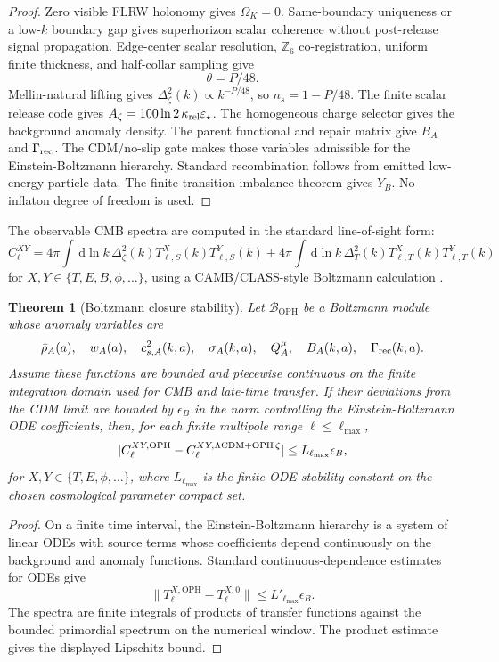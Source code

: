 \documentclass[11pt]{article}
\newtheorem{theorem}{Theorem}[section]
\newcommand{\OPH}{\mathrm{OPH}}
\newcommand{\Zsix}{\mathbb Z_6}
\newcommand{\dd}{\,\mathrm d}
\begin{document}
\begin{proof}
Zero visible FLRW holonomy gives \(\Omega_K=0\). Same-boundary uniqueness or a low-\(k\) boundary
gap gives superhorizon scalar coherence without post-release signal propagation. Edge-center scalar
resolution, \(\Zsix\) co-registration, uniform finite thickness, and half-collar sampling give
\[
\theta=P/48.
\]
Mellin-natural lifting gives \(\Delta_\zeta^2(k)\propto k^{-P/48}\), so \(n_s=1-P/48\). The finite
scalar release code gives \(A_\zeta=100\ln2\,\kappa_{\rm rel}\varepsilon_\star\). The homogeneous
charge selector gives the background anomaly density. The parent functional and repair matrix give
\(B_A\) and \(\Gamma_{\rm rec}\). The CDM/no-slip gate makes those variables admissible for the
Einstein-Boltzmann hierarchy. Standard recombination follows from emitted low-energy particle data.
The finite transition-imbalance theorem gives \(Y_B\). No inflaton degree of freedom is used.
\end{proof}

The observable CMB spectra are computed in the standard line-of-sight form:
\[
\boxed{
C_\ell^{XY}
=
4\pi\int\dd\ln k\,
\Delta_\zeta^2(k)T_{\ell,S}^{X}(k)T_{\ell,S}^{Y}(k)
+
4\pi\int\dd\ln k\,
\Delta_T^2(k)T_{\ell,T}^{X}(k)T_{\ell,T}^{Y}(k)
}
\]
for \(X,Y\in\{T,E,B,\phi,\ldots\}\), using a CAMB/CLASS-style Boltzmann calculation
\cite{camb,class}.

\begin{theorem}[Boltzmann closure stability]\label{thm:boltzmann-stability}
Let \(\mathcal B_{\OPH}\) be a Boltzmann module whose anomaly variables are
\[
\bar\rho_A(a),\quad
w_A(a),\quad
c_{s,A}^2(k,a),\quad
\sigma_A(k,a),\quad
Q_A^\mu,\quad
B_A(k,a),\quad
\Gamma_{\rm rec}(k,a).
\]
Assume these functions are bounded and piecewise continuous on the finite integration domain used
for CMB and late-time transfer. If their deviations from the CDM limit are bounded by
\(\epsilon_B\) in the norm controlling the Einstein-Boltzmann ODE coefficients, then, for each
finite multipole range \(\ell\le\ell_{\max}\),
\[
|C_\ell^{XY,\OPH}-C_\ell^{XY,\Lambda{\rm CDM}+{\rm OPH}\,\zeta}|
\le
L_{\ell_{\max}}\epsilon_B,
\]
for \(X,Y\in\{T,E,\phi,\ldots\}\), where \(L_{\ell_{\max}}\) is the finite ODE stability constant
on the chosen cosmological parameter compact set.
\end{theorem}

\begin{proof}
On a finite time interval, the Einstein-Boltzmann hierarchy is a system of linear ODEs with source
terms whose coefficients depend continuously on the background and anomaly functions. Standard
continuous-dependence estimates for ODEs give
\[
\|T_{\ell}^{X,\OPH}-T_{\ell}^{X,0}\|
\le
L'_{\ell_{\max}}\epsilon_B.
\]
The spectra are finite integrals of products of transfer functions against the bounded primordial
spectrum on the numerical window. The product estimate gives the displayed Lipschitz bound.
\end{proof}
\end{document}
